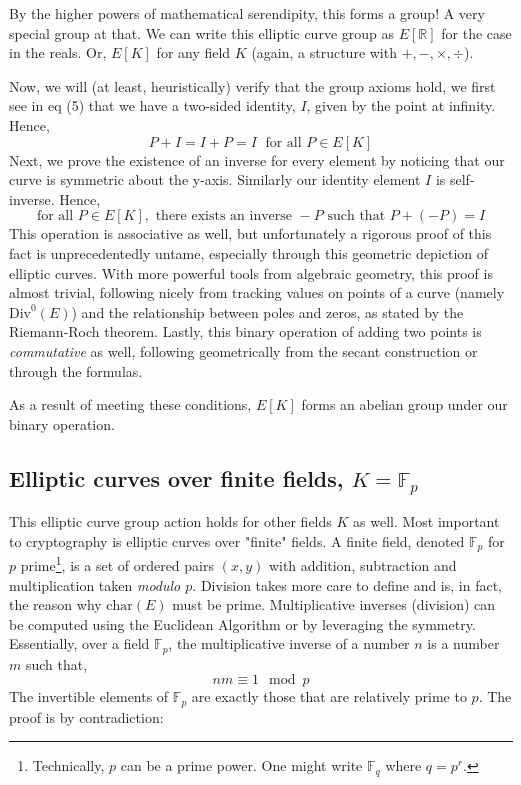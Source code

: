 \documentclass[11pt, a4paper]{report}
\newcommand{\reals}{\mathbb{R}}
\newcommand{\field}{\mathbb{F}}
\begin{document}
By the higher powers of mathematical serendipity, this forms a group! A very special group at that. We can write this elliptic curve group as $E[\reals]$ for the case in the reals. Or, $E[K]$ for any field $K$ (again, a structure with $+, -, \times, \div$).

	Now, we will (at least, heuristically) verify that the group axioms hold, we first see in eq (5) that we have a two-sided identity, $I$, given by the point at infinity. Hence,
\[ P + I = I + P = I \; \text{ for all } P \in E[K] \]
Next, we prove the existence of an inverse for every element by noticing that our curve is symmetric about the y-axis. Similarly our identity element $I$ is self-inverse. Hence,
\[ \text{for all } P \in E[K], \text{ there exists an inverse } -P \text{ such that } P + (-P) = I \]
This operation is associative as well, but unfortunately a rigorous proof of this fact is unprecedentedly untame, especially through this geometric depiction of elliptic curves. With more powerful tools from algebraic geometry, this proof is almost trivial, following nicely from  tracking values on points of a curve (namely $\mathrm{Div}^0(E)$) and the relationship between poles and zeros, as stated by the Riemann-Roch theorem.\autocite[66]{silverman}
Lastly, this binary operation of adding two points is \textit{commutative} as well, following geometrically from the secant construction or through the formulas.

As a result of meeting these conditions, $E[K]$ forms an abelian group under our binary operation.

\subsection{Elliptic curves over finite fields, $K = \field_p$}

This elliptic curve group action holds for other fields $K$ as well. Most important to cryptography is elliptic curves over "finite" fields. 
A finite field, denoted $\field_p$ for $p$ prime\footnote{Technically, $p$ can be a prime power. 
One might write $\field_q$ where $q = p^r$.}, is a set of ordered pairs $(x,y)$ with addition, subtraction and multiplication taken \textit{modulo $p$}. 
Division takes more care to define and is, in fact, the reason why $\mathrm{char}(E)$ must be prime.\autocite[159]{saracino}
Multiplicative inverses (division) can be computed using the Euclidean Algorithm or by leveraging the symmetry. Essentially, over a field $\field_p$, the multiplicative inverse of a number $n$ is a number $m$ such that,
\[ nm \equiv 1 \mod p\]
The invertible elements of $\field_p$ are exactly those that are relatively prime to $p$. The proof is by contradiction:
\end{document}
